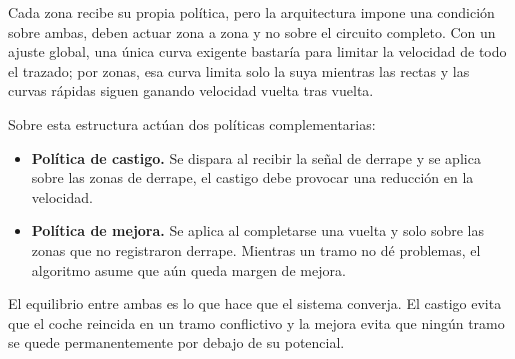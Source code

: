 Cada zona recibe su propia política, pero la arquitectura impone una condición sobre ambas, deben actuar zona a zona y no sobre el circuito completo. Con un ajuste global, una única curva exigente bastaría para limitar la velocidad de todo el trazado; por zonas, esa curva limita solo la suya mientras las rectas y las curvas rápidas siguen ganando velocidad vuelta tras vuelta.

Sobre esta estructura actúan dos políticas complementarias:
\begin{itemize}
    \item \textbf{Política de castigo.} Se dispara al recibir la señal de derrape y se aplica sobre las zonas de derrape, el castigo debe provocar una reducción en la velocidad.
    \item \textbf{Política de mejora.} Se aplica al completarse una vuelta y solo sobre las zonas que no registraron derrape. Mientras un tramo no dé problemas, el algoritmo asume que aún queda margen de mejora.
\end{itemize}

El equilibrio entre ambas es lo que hace que el sistema converja. El castigo evita que el coche reincida en un tramo conflictivo y la mejora evita que ningún tramo se quede permanentemente por debajo de su potencial.